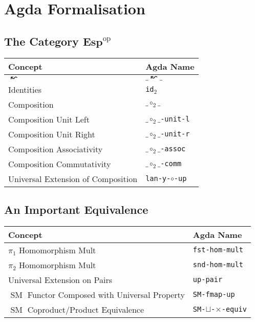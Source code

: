 \documentclass[12pt, parskip, DIV=14]{scrbook}
\renewcommand{\circ}{\vysmwhtcircle}
\newcommand{\SM}{\operatorname{SM}}
\newcommand{\Esp}{\mathbf{Esp}}
\newcommand{\op}[1]{#1^\mathrm{op}}
\begin{document}
\section{Agda Formalisation}

\subsection{The Category $\op\Esp$}

\begin{center}
\begin{tabular}{ll}
  Concept & Agda Name \\
  \hline
  $\leftwavearrow$ & $\_\leftwavearrow\_$ \\
  Identities & \texttt{id$_2$} \\
  Composition & $\_\circ_2\_$ \\
  Composition Unit Left & \texttt{$\_\circ_2\_$-unit-l} \\
  Composition Unit Right & \texttt{$\_\circ_2\_$-unit-r} \\
  Composition Associativity & \texttt{$\_\circ_2\_$-assoc} \\
  Composition Commutativity & \texttt{$\_\circ_2\_$-comm} \\
  Universal Extension of Composition & \texttt{lan-y-$\circ$-up} \\
\end{tabular}
\end{center}

\subsection{An Important Equivalence}

\begin{center}
\begin{tabular}{ll}
  Concept & Agda Name \\
  \hline
  $\pi_1$ Homomorphism Mult & \texttt{fst-hom-mult} \\
  $\pi_2$ Homomorphism Mult & \texttt{snd-hom-mult} \\
  Universal Extension on Pairs & \texttt{up-pair} \\
  $\SM$ Functor Composed with Universal Property & \texttt{SM-fmap-up} \\
  $\SM$ Coproduct/Product Equivalence & \texttt{SM-$\sqcup$-$\times$-equiv} \\
\end{tabular}
\end{center}
\end{document}
